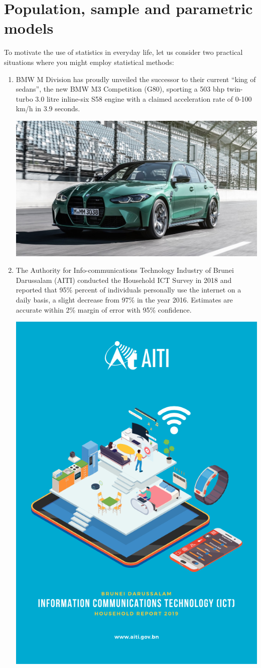 \documentclass[
]{book}
\theoremstyle{definition}
\theoremstyle{definition}
\theoremstyle{definition}
\theoremstyle{definition}
\theoremstyle{remark}
\begin{document}
\hypertarget{population-sample-and-parametric-models}{%
\section*{Population, sample and parametric models}\label{population-sample-and-parametric-models}}

To motivate the use of statistics in everyday life, let us consider two practical situations where you might employ statistical methods:

\begin{enumerate}
\def\labelenumi{\arabic{enumi}.}
\item
  BMW M Division has proudly unveiled the successor to their current ``king of sedans'', the new BMW M3 Competition (G80), sporting a 503 bhp twin-turbo 3.0 litre inline-six S58 engine with a claimed acceleration rate of 0-100 km/h in 3.9 seconds.

  \begin{center}\includegraphics[width=0.6\linewidth]{figure/00-g80} \end{center}
\item
  The Authority for Info-communications Technology Industry of Brunei Darussalam (AITI) conducted the Household ICT Survey in 2018 and reported that 95\% percent of individuals personally use the internet on a daily basis, a slight decrease from 97\% in the year 2016. Estimates are accurate within 2\% margin of error with 95\% confidence.

  \begin{center}\includegraphics[width=0.6\linewidth]{figure/00-aiti} \end{center}
\end{enumerate}
\end{document}
